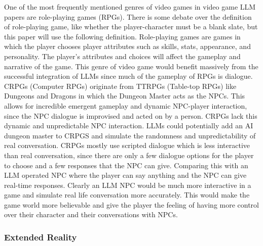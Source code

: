 \documentclass[10pt,twocolumn]{article}
\begin{document}
            \par
            One of the most frequently mentioned genres of video games in video game LLM papers are role-playing games (RPGs). There is some debate over the definition of role-playing game, like whether the player-character must be a blank slate, but this paper will use the following definition. Role-playing games are games in which the player chooses player attributes such as skills, stats, appearance, and personality. The player's attributes and choices will affect the gameplay and narrative of the game. This genre of video game would benefit massively from the successful integration of LLMs since much of the gameplay of RPGs is dialogue. CRPGs (Computer RPGs) originate from TTRPGs (Table-top RPGs) like Dungeons and Dragons in which the Dungeon Master acts as the NPCs. This allows for incredible emergent gameplay and dynamic NPC-player interaction, since the NPC dialogue is improvised and acted on by a person. CRPGs lack this dynamic and unpredictable NPC interaction. LLMs could potentially add an AI dungeon master to CRPGS and simulate the randomness and unpredictability of real conversation. CRPGs mostly use scripted dialogue which is less interactive than real conversation, since there are only a few dialogue options for the player to choose and a few responses that the NPC can give. Comparing this with an LLM operated NPC where the player can say anything and the NPC can give real-time responses. Clearly an LLM NPC would be much more interactive in a game and simulate real life conversation more accurately. This would make the game world more believable and give the player the feeling of having more control over their character and their conversations with NPCs.

        \subsubsection{Extended Reality}
\end{document}

